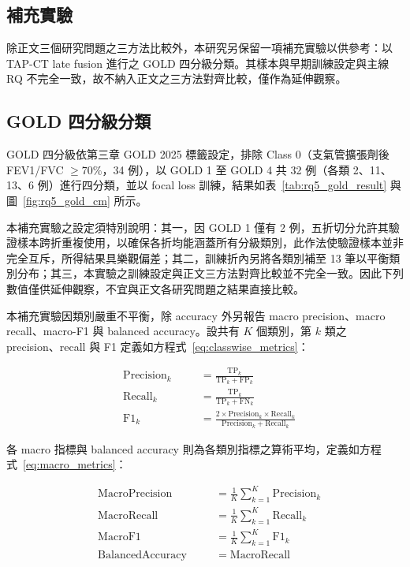 \begin{ZhChapter}

\chapter{補充實驗}\label{chap:appendix}

除正文三個研究問題之三方法比較外，本研究另保留一項補充實驗以供參考：以 TAP-CT late fusion 進行之 GOLD 四分級分類。其樣本與早期訓練設定與主線 RQ 不完全一致，故不納入正文之三方法對齊比較，僅作為延伸觀察。

\section{GOLD 四分級分類}

GOLD 四分級依第三章 GOLD 2025 標籤設定，排除 Class 0（支氣管擴張劑後 FEV1/FVC $\geq 70\%$，34 例），以 GOLD 1 至 GOLD 4 共 32 例（各類 2、11、13、6 例）進行四分類，並以 focal loss 訓練，結果如表~\ref{tab:rq5_gold_result} 與圖~\ref{fig:rq5_gold_cm} 所示。

本補充實驗之設定須特別說明：其一，因 GOLD 1 僅有 2 例，五折切分允許其驗證樣本跨折重複使用，以確保各折均能涵蓋所有分級類別，此作法使驗證樣本並非完全互斥，所得結果具樂觀偏差；其二，訓練折內另將各類別補至 13 筆以平衡類別分布；其三，本實驗之訓練設定與正文三方法對齊比較並不完全一致。因此下列數值僅供延伸觀察，不宜與正文各研究問題之結果直接比較。

本補充實驗因類別嚴重不平衡，除 accuracy 外另報告 macro precision、macro recall、macro-F1 與 balanced accuracy。設共有 $K$ 個類別，第 $k$ 類之 precision、recall 與 F1 定義如方程式~\eqref{eq:classwise_metrics}：

\begin{equation}
\label{eq:classwise_metrics}
\begin{alignedat}{2}
&\mathrm{Precision}_k\quad &&= \frac{\mathrm{TP}_k}{\mathrm{TP}_k + \mathrm{FP}_k} \\
&\mathrm{Recall}_k\quad &&= \frac{\mathrm{TP}_k}{\mathrm{TP}_k + \mathrm{FN}_k} \\
&\mathrm{F1}_k\quad &&= \frac{2 \times \mathrm{Precision}_k \times \mathrm{Recall}_k}{\mathrm{Precision}_k + \mathrm{Recall}_k}
\end{alignedat}
\end{equation}

各 macro 指標與 balanced accuracy 則為各類別指標之算術平均，定義如方程式~\eqref{eq:macro_metrics}：

\begin{equation}
\label{eq:macro_metrics}
\begin{alignedat}{2}
&\mathrm{MacroPrecision}\quad &&= \frac{1}{K}\sum_{k=1}^{K}\mathrm{Precision}_k \\
&\mathrm{MacroRecall}\quad &&= \frac{1}{K}\sum_{k=1}^{K}\mathrm{Recall}_k \\
&\mathrm{MacroF1}\quad &&= \frac{1}{K}\sum_{k=1}^{K}\mathrm{F1}_k \\
&\mathrm{BalancedAccuracy}\quad &&= \mathrm{MacroRecall}
\end{alignedat}
\end{equation}


\end{ZhChapter}
